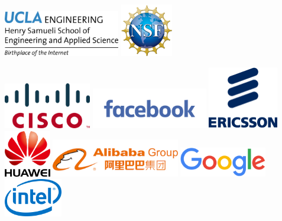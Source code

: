 \documentclass[sigconf]{acmart}
\begin{document}
\begin{center}

\includegraphics[width=2in]{ucla-hsseas.jpg}
\hspace{1in}
\includegraphics[width=0.9in]{nsf.jpg}

\hspace{0.2in}
\includegraphics[width=1.5in]{cisco.png}
\hspace{0.2in}
\includegraphics[width=2in]{facebook.png}
\hspace{0.2in}
\includegraphics[width=1.2in]{ericsson.png}
\\[0.5cm]

\hspace{0.2in}
\includegraphics[width=0.8in]{huawei.png}
\hspace{0.2in}
\includegraphics[width=2.2in]{alibaba.jpg}
\hspace{0.2in}
\includegraphics[width=1.5in]{google.png}
\hspace{0.2in}
\includegraphics[width=1in]{intel.png}
\\[0.8cm]


\end{center}
\end{document}
